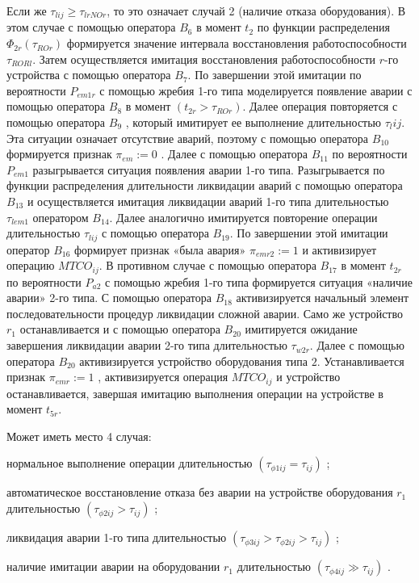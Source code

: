 Если же $\tau_{lij} \geq \tau_{lrNOr} $, то это означает случай 2 (наличие отказа оборудования). В этом случае с помощью оператора $B_6$ в момент $t_2$ по функции распределения $\Phi_{2r}(\tau_{ROr})$ формируется значение интервала восстановления работоспособности $\tau_{RORl}$. Затем осуществляется имитация восстановления работоспособности $r$-го устройства с помощью оператора $B_7$.  По завершении этой имитации по вероятности $P_{em1r}$ с помощью жребия 1-го типа моделируется появление аварии с помощью оператора $B_8$ в момент $( t_{2r} > \tau_{ROr} )$.  Далее операция повторяется с помощью оператора $B_{9}$ , который имитирует ее выполнение длительностью  $\tau_lij$. Эта ситуации означает отсутствие аварий, поэтому с помощью оператора $B_{10}$ формируется признак $\pi_{em}:=0$ . Далее с помощью оператора $B_11$ по вероятности $P_{em1}$ разыгрывается ситуация появления аварии 1-го типа. Разыгрывается по функции распределения длительности ликвидации аварий с помощью оператора $B_{13}$ и осуществляется имитация ликвидации аварий 1-го типа  длительностью $\tau_{lem1}$ оператором $B_14$. Далее аналогично имитируется повторение операции длительностью $\tau_{lij}$ с помощью оператора  $B_{19}$.  По завершении этой имитации оператор $B_{16}$ формирует признак «была авария» $\pi_{emr2}:=1$ и активизирует операцию  $MTCO_{ij}$. В противном случае с помощью оператора  $B_{17}$ в момент $t_{2r}$ по вероятности  $P_{a2}$ с помощью жребия 1-го типа формируется ситуация «наличие аварии» 2-го типа. С помощью оператора $B_18$ активизируется начальный элемент последовательности процедур ликвидации сложной аварии. Само же устройство $r_1$ останавливается и с помощью оператора $B_20$ имитируется ожидание завершения ликвидации аварии 2-го типа длительностью $\tau_{w2r}$.  Далее с помощью оператора $B_{20}$ активизируется устройство оборудования типа $2$. Устанавливается признак $\pi_{emr}:=1$  , активизируется операция $MTCO_{ij}$ и устройство останавливается, завершая имитацию  выполнения операции на устройстве в момент $t_{5r}$.

Может иметь место 4 случая:
\begin{textitemize}
    \item нормальное выполнение операции длительностью $( \tau_{ \phi 1 ij} = \tau_{ij} )$ ;

    \item автоматическое восстановление отказа без аварии на устройстве оборудования $r_1$ длительностью $( \tau_{\phi 2 ij} > \tau_{ij} )$ ;

    \item ликвидация аварии 1-го типа длительностью $( \tau_{\phi 3 ij} > \tau_{\phi 2 ij} > \tau_{ij} )$  ;

    \item наличие имитации аварии на оборудовании $r_1$ длительностью $( \tau_{ \phi 4 ij} \gg  \tau_{ij} )$ .

\end{textitemize}

